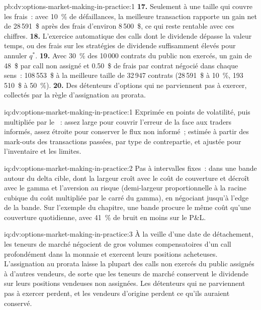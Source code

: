 \begin{solution}{pb:dv:options-market-making-in-practice:1}
\textbf{17.} Seulement à une taille qui couvre les frais~: avec 10~\% de défaillances, la meilleure transaction rapporte un gain net de 28\,591~\$ après des frais d'environ 8\,500~\$, ce qui reste rentable avec ces chiffres.
\textbf{18.} L'exercice automatique des calls dont le dividende dépasse la valeur temps, ou des frais sur les stratégies de dividende suffisamment élevés pour annuler $q^*$.
\textbf{19.} Avec 30~\% des 10\,000 contrats du public non exercés, un gain de 48~\$ par call non assigné et 0.50~\$ de frais par contrat négocié dans chaque sens~: 108\,553~\$ à la meilleure
taille de 32\,947 contrats (28\,591~\$ à 10~\%, 193\,510~\$ à 50~\%).
\textbf{20.} Des détenteurs d'options qui ne parviennent pas à exercer, collectés par la règle d'assignation au prorata.
\end{solution}

\begin{solution}{iq:dv:options-market-making-in-practice:1}
Exprimée en points de volatilité, puis multipliée par le ~: assez large pour couvrir l'erreur de la  face aux traders informés, assez étroite pour conserver le flux non informé~; estimée à partir des
mark-outs des transactions passées, par type de contrepartie, et ajustée pour l'inventaire et les limites.
\end{solution}

\begin{solution}{iq:dv:options-market-making-in-practice:2}
Pas à intervalles fixes~: dans une bande autour du delta cible, dont la largeur croît avec le coût de couverture et décroît avec le gamma et l'aversion au risque (demi-largeur proportionnelle
à la racine cubique du coût multipliée par le carré du gamma), en négociant jusqu'à l'edge de la bande. Sur l'exemple du chapitre, une bande procure le même coût qu'une couverture quotidienne, avec
41~\% de bruit en moins sur le P\&L.
\end{solution}

\begin{solution}{iq:dv:options-market-making-in-practice:3}
À la veille d'une date de détachement, les teneurs de marché négocient de gros volumes compensatoires d'un call profondément dans la monnaie et exercent leurs positions acheteuses. L'assignation au prorata laisse la plupart des
calls non exercés du public assignés à d'autres vendeurs, de sorte que les teneurs de marché conservent le dividende sur leurs positions vendeuses non assignées. Les détenteurs qui ne parviennent pas à exercer
perdent, et les vendeurs d'origine perdent ce qu'ils auraient conservé.
\end{solution}

